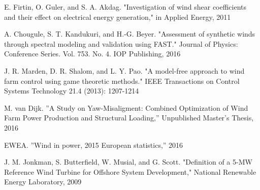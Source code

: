 \begin{thebibliography}{99}
E. Firtin, O. Guler, and S. A. Akdag. "Investigation of wind shear coefficients and their effect on electrical energy generation," in Applied Energy, 2011

A. Chougule, S. T. Kandukuri, and H.-G. Beyer. "Assessment of synthetic winds through spectral modeling and validation using FAST." Journal of Physics: Conference Series. Vol. 753. No. 4. IOP Publishing, 2016

J. R. Marden, D. R. Shalom, and L. Y. Pao. "A model-free approach to wind farm control using game theoretic methods." IEEE Transactions on Control Systems Technology 21.4 (2013): 1207-1214	


M. van Dijk. ''A Study on Yaw-Misaligment: Combined Optimization of Wind Farm Power Production and Structural Loading,'' Unpublished Master's Thesis, 2016

EWEA. ''Wind in power, 2015 European statistics,'' 2016

J. M. Jonkman, S. Butterfield, W. Musial, and G. Scott. "Definition of a 5-MW Reference	Wind Turbine for Offshore System Development," National Renewable Energy Laboratory, 2009










\end{thebibliography}